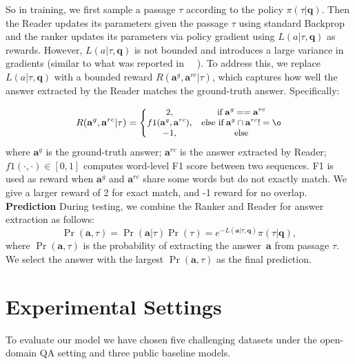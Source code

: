 \documentclass[letterpaper]{article} %
\begin{document}
So in training, we first sample a passage $\tau$ according to the policy $\pi (\tau | \mathbf{q})$. Then the Reader updates its parameters given the passage $\tau$ using standard Backprop and the ranker updates its parameters via policy gradient using $L(a|\tau,\mathbf{q})$ as rewards. However, $L(a|\tau,\mathbf{q})$ is not bounded and introduces a large variance in gradients (similar to what was reported in ~\citeauthor{mnih2014recurrent}~\citeyear{mnih2014recurrent}). To address this, we replace $L(a|\tau,\mathbf{q})$ with a bounded reward $R(\mathbf{a}^g,\mathbf{a}^{rc}|\tau)$, which captures how well the answer extracted by the Reader matches the ground-truth answer.  Specifically:


\begin{equation}
\small
R(\mathbf{a}^g,\mathbf{a}^{rc}| \tau) =\left\{\begin{matrix}
2, & \text{if} \; \mathbf{a}^g == \mathbf{a}^{rc}\\ 
f1(\mathbf{a}^{g},\mathbf{a}^{rc}), & \text{else if}\; \mathbf{a}^{g} \cap \mathbf{a}^{rc} !=\o  \\ 
-1, & \text{else}
\end{matrix}\right.
\end{equation}
where $\mathbf{a}^g$ is the ground-truth answer; $\mathbf{a}^{rc}$ is the answer extracted by Reader; $f1(\cdot ,\cdot )\in [0,1]$ %
computes
word-level F1 score between two sequences. F1 is used as reward when %
$\mathbf{a}^g$ and $\mathbf{a}^{rc}$ share some words but do not exactly match. We give a larger reward of 2 for exact match, and -1 reward for no overlap. \\

\noindent\textbf{Prediction} \quad
During testing, we combine the Ranker and Reader for answer extraction as follows: 
\begin{equation}
\Pr(\mathbf{a},\tau) = \Pr(\mathbf{a}|\tau)\Pr(\tau) =
e^{-L(\mathbf{a}|\tau,\mathbf{q}) } \pi(\tau|\mathbf{q}),
\label{eqn:pred_prob}
\end{equation}
where $\Pr(\mathbf{a},\tau)$ is the probability of extracting the answer~$\textbf{a}$ from passage $\tau$. We select the answer with the largest $\Pr(\mathbf{a},\tau)$ as the final prediction. 



\section{Experimental Settings}
To evaluate our model we have chosen five challenging datasets under the open-domain QA setting  and three public baseline models.
\end{document}
